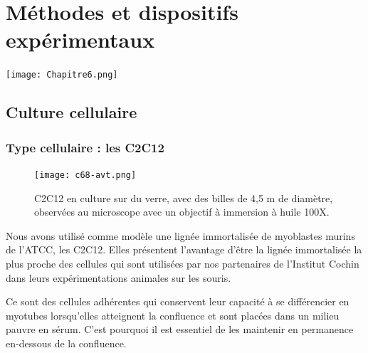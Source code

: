 %
%
%

\chapter{Méthodes et dispositifs expérimentaux}

\begin{center}
\texttt{[image: Chapitre6.png]}
\end{center}

\newpage

\section{Culture cellulaire}
	\subsection{Type cellulaire : les C2C12}
	
	\begin{figure}
	\texttt{[image: c68-avt.png]}
	\caption{C2C12 en culture sur du verre, avec des billes de 4,5 \micro m de diamètre, observées au microscope avec un objectif à immersion à huile 100X.}
	\end{figure}
	
	Nous avons utilisé comme modèle une lignée immortalisée de myoblastes murins de l'ATCC, les C2C12. Elles présentent l'avantage d'être la lignée immortalisée la plus proche des cellules qui sont utilisées par nos partenaires de l'Institut Cochin dans leurs expérimentations animales sur les souris. 
	
	Ce sont des cellules adhérentes qui conservent leur capacité à se différencier en myotubes lorsqu'elles atteignent la confluence et sont placées dans un milieu pauvre en sérum. C'est pourquoi il est essentiel de les maintenir en permanence en-dessous de la confluence. 
	
